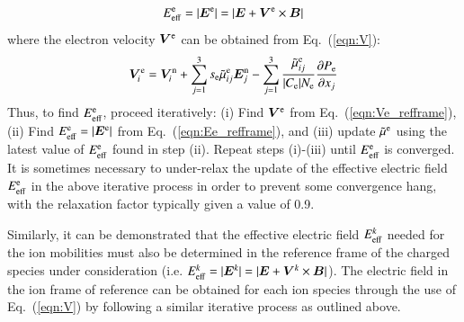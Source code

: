 \documentclass[twoside,onecolumn,10pt]{waflarticle}
\renewcommand{\vec}[1]{\bm{#1}}
\newcommand{\nd}{3}
\renewcommand{\vec}[1]{\bm{ #1 }}
\begin{document}
%
\begin{equation}
 E_{\rm eff}^{\rm e}=|\vec{E}^{\rm e}|=|\vec{E}+\vec{V}^{\rm e}\times\vec{B}| 
\label{eqn:Ee_refframe}
\end{equation}
%
where the electron velocity $\vec{V}^{\rm e}$ can be obtained from Eq.\ (\ref{eqn:V}):
%
\begin{equation}
  \vec{V}^{\rm e}_i = \vec{V}^{\rm n}_i+\sum_{j=1}^\nd s_{\rm e} \wtilde{\mu}^{\rm e}_{ij}  \vec{E}_j^{\rm n}
             - \sum_{j=1}^\nd  \frac{\wtilde{\mu}^{\rm e}_{ij}}{|C_{\rm e}| N_{\rm e}} \frac{\partial P_{\rm e}}{\partial x_j}
\label{eqn:Ve_refframe}
\end{equation}
%
Thus, to find $E_{\rm eff}^{\rm e}$, proceed iteratively: (i) Find $\vec{V}^{\rm e}$ from Eq.\ (\ref{eqn:Ve_refframe}), (ii) Find $E_{\rm eff}^{\rm e}=|\vec{E}^{\rm e}|$ from Eq.\ (\ref{eqn:Ee_refframe}), and (iii) update $\tilde{\mu}^{\rm e}$ using the latest value of $E_{\rm eff}^{\rm e}$ found in step (ii). Repeat steps (i)-(iii) until $E_{\rm eff}^{\rm e}$ is converged. It is sometimes necessary to under-relax the update of the effective electric field $E_{\rm eff}^{\rm e}$ in the above iterative process in order to prevent some convergence hang, with the relaxation factor typically given a value of 0.9.   

Similarly, it can be demonstrated that the effective electric field  $E_{\rm eff}^k$ needed for the ion mobilities  must also be determined in the reference frame of the charged species under consideration (i.e. $E_{\rm eff}^k=|\vec{E}^k|=|\vec{E}+\vec{V}^k\times \vec{B}|$). The electric field in the ion frame of reference can be obtained for each ion species through the use of Eq.\ (\ref{eqn:V}) by following a similar iterative process as  outlined above. 
 









\end{document}
